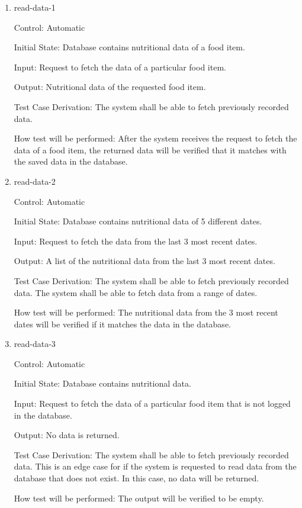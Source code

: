 \documentclass[12pt, titlepage]{article}
\begin{document}
	\begin{enumerate}
		
		\item{read-data-1\\}
		
		Control: Automatic
		
		Initial State: Database contains nutritional data of a food item.
		
		Input: Request to fetch the data of a particular food item.
		
		Output: Nutritional data of the requested food item.
		
		Test Case Derivation: The system shall be able to fetch previously 
		recorded data.
		
		How test will be performed: After the system receives the request to 
		fetch the data of a food item, the returned data will be verified that 
		it matches with the saved data in the database.
		
		\item{read-data-2\\}
		
		Control: Automatic
		
		Initial State: Database contains nutritional data of 5 different dates.
		
		Input: Request to fetch the data from the last 3 most recent dates.
		
		Output: A list of the nutritional data from the last 3 most recent 
		dates.
		
		Test Case Derivation: The system shall be able to fetch previously 
		recorded data. The system shall be able to fetch data from a range of 
		dates.
		
		How test will be performed: The nutritional data from the 3 most recent 
		dates will be verified if it matches the data in the database.
		
		\item{read-data-3\\}
		
		Control: Automatic
		
		Initial State: Database contains nutritional data.
		
		Input: Request to fetch the data of a particular food item that is not 
		logged in the database.
		
		Output: No data is returned.
		
		Test Case Derivation: The system shall be able to fetch previously 
		recorded data. This is an edge case for if the system is requested to 
		read data from the database that does not exist. In this case, no data 
		will be returned.
		
		How test will be performed: The output will be verified to be empty.
	\end{enumerate}
	
\end{document}
